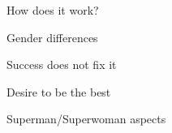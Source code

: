 \documentclass[aspectratio=169]{beamer}
\begin{document}
\begin{frame}
  \begin{center}
    \Huge How does it work?
    \\ \small \cite{hh15}
  \end{center}
\end{frame}

\begin{frame}
  \begin{center}
    \Huge Gender differences
    \\ \small \cite{clanceimes78}
  \end{center}
\end{frame}

\begin{frame}
  \begin{center}
    \Huge Success does not fix it
    \\ \small \cite{clanceimes78}
  \end{center}
\end{frame}

\begin{frame}
  \begin{center}
    \Huge Desire to be the best
    \\ \small \cite{sakulku11}
  \end{center}
\end{frame}

\begin{frame}
  \begin{center}
    \Huge Superman/Superwoman aspects
    \\ \small \cite{sakulku11}
  \end{center}
\end{frame}
\end{document}
